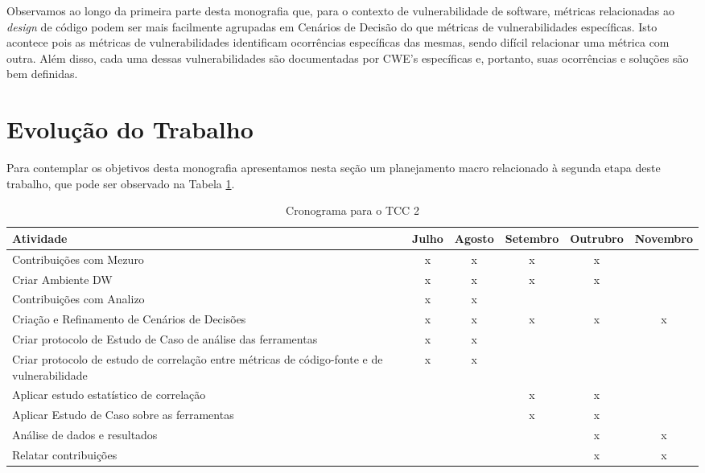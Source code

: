 %

Observamos ao longo da primeira parte desta monografia que, para o contexto de vulnerabilidade de software, métricas relacionadas ao \emph{design} de código podem ser mais facilmente agrupadas em Cenários de Decisão do que métricas de vulnerabilidades específicas. Isto acontece pois as métricas de vulnerabilidades identificam ocorrências específicas das mesmas, sendo difícil relacionar uma métrica com outra. Além disso, cada uma dessas vulnerabilidades são documentadas por CWE's específicas e, portanto, suas ocorrências e soluções são bem definidas.


\section{Evolução do Trabalho}

%

Para contemplar os objetivos desta monografia apresentamos nesta seção um planejamento macro relacionado à segunda etapa deste trabalho, que pode ser observado na Tabela \ref{tab:cronograma}.

%


	\begin{table}[H]
	\begin{center}
	    \begin{tabular}{ | p{5cm} | c | c |  c |  c |  c |}
	    \hline
	    Atividade & Julho & Agosto & Setembro & Outrubro & Novembro \\ \hline
	    Contribuições com Mezuro & x & x & x & x &  \\ \hline
	    Criar Ambiente DW & x & x & x & x & \\ \hline
	    Contribuições com Analizo & x & x &  &  & \\ \hline
	    Criação e Refinamento de Cenários de Decisões & x & x & x & x & x\\ \hline
	    Criar protocolo de Estudo de Caso de análise das ferramentas & x & x &  &  & \\ \hline
	    Criar protocolo de estudo de correlação entre métricas de código-fonte e de vulnerabilidade & x & x &  &  & \\ \hline
	    Aplicar estudo estatístico de correlação &  &  & x & x & \\ \hline
	    Aplicar Estudo de Caso sobre as ferramentas &  &  & x & x & \\ \hline
	    Análise de dados e resultados &  &  &  & x & x\\ \hline
	    Relatar contribuições &  &  &  & x & x\\ \hline
	    \end{tabular}
	    \caption{Cronograma para o TCC 2}
	    \label{tab:cronograma}
	\end{center}
	\end{table}

